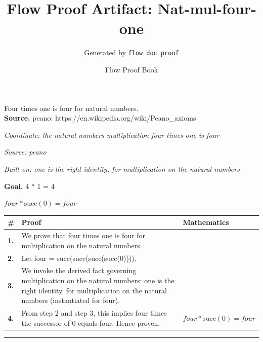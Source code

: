 \documentclass[11pt]{article}
\title{Flow Proof Artifact: Nat-mul-four-one}
\author{Generated by \texttt{flow doc proof}}
\date{Flow Proof Book}
\theoremstyle{definition}
\begin{document}
\maketitle
Four times one is four for natural numbers.\\[0.5em]
\textbf{Source.} peano: https://en.wikipedia.org/wiki/Peano\_axioms\\[0.5em]
\bigskip
{}\par
\smallskip\noindent\textit{Coordinate: the natural numbers \cdot multiplication \cdot four times one is four}\par
\smallskip\noindent\textit{Source: peano}\par
\smallskip\noindent\textit{Built on: one is the right identity, for multiplication on the natural numbers}\par
\medskip
\noindent\textbf{Goal.} 4 * 1 = 4\par
\noindent$\displaystyle four * \mathrm{succ}(0) = four$\par
\medskip
\noindent
\begin{tabular}{@{} >{\raggedright\arraybackslash}p{} >{\raggedright\arraybackslash}p{} >{\raggedleft\arraybackslash}p{} @{}}
\textbf{\#} & \textbf{Proof} & \textbf{Mathematics} \\
\midrule
\textbf{1.} & We prove that four times one is four for multiplication on the natural numbers. & \\[0.45em]
\textbf{2.} & Let four = succ(succ(succ(succ(0)))). & \\[0.45em]
\textbf{3.} & We invoke the derived fact governing multiplication on the natural numbers: one is the right identity, for multiplication on the natural numbers (instantiated for four). & \\[0.45em]
\textbf{4.} & From step 2 and step 3, this implies four times the successor of 0 equals four. Hence proven. & $\displaystyle four * \mathrm{succ}(0) = four$ \\[0.45em]
\bottomrule
\end{tabular}
\label{thm:Nat-multiplication-four_times_one_is_four}
\par\medskip\hrule
\end{document}
